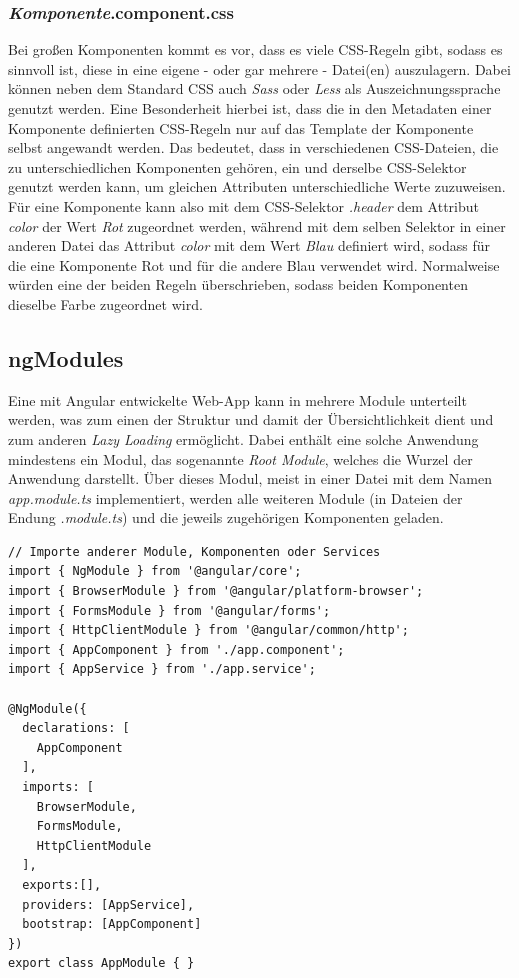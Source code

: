 \subsubsection{\textit{Komponente}.component.css}
\label{sec:technologies:angular:component:css}

Bei großen Komponenten kommt es vor, dass es viele \acs{CSS}-Regeln gibt, sodass es sinnvoll ist, diese in eine eigene - oder gar mehrere - Datei(en) auszulagern. Dabei können neben dem Standard CSS auch \textit{Sass} oder \textit{Less} als Auszeichnungssprache genutzt werden.
Eine Besonderheit hierbei ist, dass die in den Metadaten einer Komponente definierten \acs{CSS}-Regeln nur auf das Template der Komponente selbst angewandt werden. Das bedeutet, dass in verschiedenen CSS-Dateien, die zu unterschiedlichen Komponenten gehören, ein und derselbe \acs{CSS}-Selektor genutzt werden kann, um gleichen Attributen unterschiedliche Werte zuzuweisen.
Für eine Komponente kann also mit dem \acs{CSS}-Selektor \textit{.header} dem Attribut \textit{color} der Wert \textit{Rot} zugeordnet werden, während mit dem selben Selektor in einer anderen Datei das Attribut \textit{color} mit dem Wert \textit{Blau} definiert wird, sodass für die eine Komponente Rot und für die andere Blau verwendet wird. Normalweise würden eine der beiden Regeln überschrieben, sodass beiden Komponenten dieselbe Farbe zugeordnet wird.

\subsection{ngModules}
\label{sec:technologies:angular:module}
Eine mit Angular entwickelte Web-App kann in mehrere Module unterteilt werden, was zum einen der Struktur und damit der Übersichtlichkeit dient und zum anderen \textit{Lazy Loading} ermöglicht. Dabei enthält eine solche Anwendung mindestens ein Modul, das sogenannte \textit{Root Module}, welches die Wurzel der Anwendung darstellt. Über dieses Modul, meist in einer Datei mit dem Namen \textit{app.module.ts} implementiert, werden alle weiteren Module (in Dateien der Endung \textit{.module.ts}) und die jeweils zugehörigen Komponenten geladen.
\begin{lstlisting}[float,floatplacement=h, style=htmlcssjs, caption={Bespiel für eine \textit{App.module.ts}-Datei}, label={AppModule}]
// Importe anderer Module, Komponenten oder Services
import { NgModule } from '@angular/core';
import { BrowserModule } from '@angular/platform-browser';
import { FormsModule } from '@angular/forms';
import { HttpClientModule } from '@angular/common/http';
import { AppComponent } from './app.component';
import { AppService } from './app.service';

@NgModule({
  declarations: [
    AppComponent
  ],
  imports: [
    BrowserModule,
    FormsModule,
    HttpClientModule
  ],
  exports:[],
  providers: [AppService],
  bootstrap: [AppComponent]
})
export class AppModule { }
\end{lstlisting}

